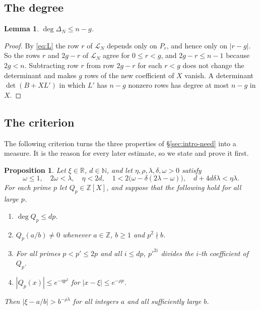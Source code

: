 \documentclass[11pt]{amsart}
\newtheorem{lemma}[theorem]{Lemma}
\newtheorem{proposition}[theorem]{Proposition}
\theoremstyle{definition}
\theoremstyle{remark}
\numberwithin{equation}{section}
\newcommand{\Z}{\mathbb Z}
\newcommand{\R}{\mathbb R}
\newcommand{\N}{\mathbb N}
\newcommand{\cL}{\mathcal L}
\begin{document}
\subsection{The degree}
\begin{lemma}\label{lem:degree}
$\deg\Delta_N\le n-g$.
\end{lemma}

\begin{proof}
By \eqref{eq:L} the row $r$ of $\cL_N$ depends only on $P_r$, and hence only on $|r-g|$. So the rows $r$
and $2g-r$ of $\cL_N$ agree for $0\le r<g$, and $2g-r\le n-1$ because $2g<n$. Subtracting row $r$ from row
$2g-r$ for each $r<g$ does not change the determinant and makes $g$ rows of the new coefficient of $X$
vanish. A determinant $\det(B+XL')$ in which $L'$ has $n-g$ nonzero rows has degree at most $n-g$ in $X$.
\end{proof}

\subsection{The criterion}\label{ssec:criterion}
The following criterion turns the three properties of \S\ref{sec:intro-need} into a measure. It is the
reason for every later estimate, so we state and prove it first.

\begin{proposition}\label{prop:criterion}
Let $\xi\in\R$, $d\in\N$, and let $\eta,\rho,\lambda,\delta,\omega>0$ satisfy
\[
 \omega\le1,\quad 2\omega<\lambda,\quad \eta<2d,\quad 1<2\bigl(\omega-\delta(2\lambda-\omega)\bigr),\quad
 d+4d\delta\lambda<\eta\lambda .
\]
For each prime $p$ let $Q_p\in\Z[X]$, and suppose that the following hold for all large $p$.
\begin{enumerate}[label=(\alph*)]
\item $\deg Q_p\le dp$.
\item $Q_p(a/b)\ne0$ whenever $a\in\Z$, $b\ge1$ and $p^2\nmid b$.
\item For all primes $p<p'\le2p$ and all $i\le dp$, $p'^{2i}$ divides the $i$-th coefficient of $Q_p$.
\item $|Q_p(x)|\le e^{-\eta p^2}$ for $|x-\xi|\le e^{-\rho p}$.
\end{enumerate}
Then $|\xi-a/b|>b^{-\rho\lambda}$ for all integers $a$ and all sufficiently large $b$.
\end{proposition}
\end{document}
